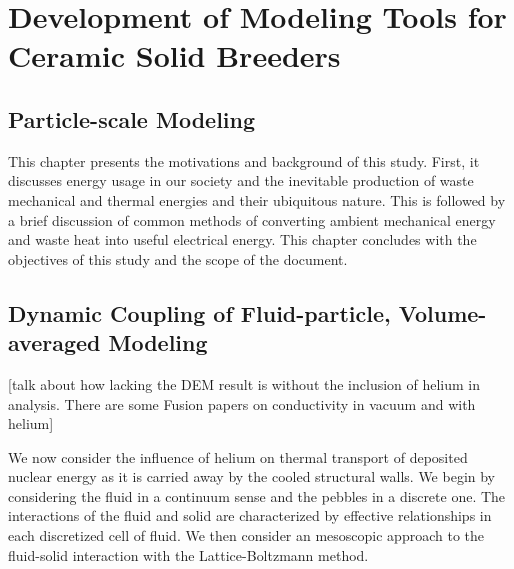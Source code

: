 \chapter{Development of Modeling Tools for Ceramic Solid Breeders}

\section{Particle-scale Modeling} \label{sec:modeling-dem}
This chapter presents the motivations and background of this study. First, it discusses energy usage in our society and the inevitable production of waste mechanical and thermal energies and their ubiquitous nature. This is followed by a brief discussion of common methods of converting ambient mechanical energy and waste heat into useful electrical energy. This chapter concludes with the objectives of this study and the scope of the document.














\section{Dynamic Coupling of Fluid-particle, Volume-averaged Modeling} \label{sec:modeling-cfd-dem}
[talk about how lacking the DEM result is without the inclusion of helium in analysis. There are some Fusion papers on conductivity in vacuum and with helium]

We now consider the influence of helium on thermal transport of deposited nuclear energy as it is carried away by the cooled structural walls. We begin by considering the fluid in a continuum sense and the pebbles in a discrete one. The interactions of the fluid and solid are characterized by effective relationships in each discretized cell of fluid. We then consider an mesoscopic approach to the fluid-solid interaction with the Lattice-Boltzmann method. 

